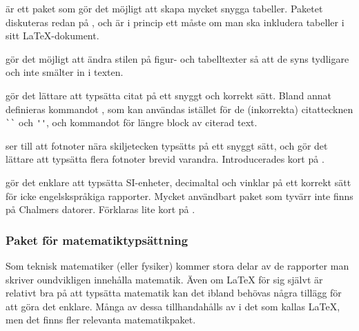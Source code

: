 \documentclass[10pt,../../a4.tex]{subfiles}
\begin{document}
\begin{description}
	\item[\pack{booktabs}]
	är ett paket som gör det möjligt att skapa mycket snygga tabeller.
	Paketet diskuteras redan på , och är i princip
	ett måste om man ska inkludera tabeller i sitt \LaTeX-dokument.

	\item[\pack{caption}]
	gör det möjligt att ändra stilen på figur- och tabelltexter så att de
	syns tydligare och inte smälter in i texten.

	\item[\pack{csquotes}]
	gör det lättare att typsätta citat på ett snyggt och korrekt sätt.
	Bland annat definieras kommandot , som kan användas
	istället för de (inkorrekta) citattecknen \verb|``| och \verb|''|, 
	och kommandot  för längre block av citerad text.

	\item[\pack{fnpct}]
	ser till att fotnoter nära skiljetecken typsätts på ett snyggt sätt,
	och gör det lättare att typsätta flera fotnoter brevid varandra.
	Introducerades kort på .
	
	\item[{\pack{siunitx}}]
	gör det enklare att typsätta SI-enheter, decimaltal och vinklar på ett
	korrekt sätt för icke engelskspråkiga rapporter. Mycket användbart
	paket som tyvärr inte finns på Chalmers datorer. Förklaras lite kort
	på .
\end{description}

\subsubsection{Paket för matematiktypsättning}
Som teknisk matematiker (eller fysiker) kommer stora delar av de rapporter
man skriver oundvikligen innehålla matematik. Även om \LaTeX{} för sig
självt är relativt bra på att typsätta matematik kan det ibland behövas
några tillägg för att göra det enklare. Många av dessa tillhandahålls av
\AmS{} i det som kallas \AmS\LaTeX, men det finns fler relevanta
matematikpaket.
\end{document}
